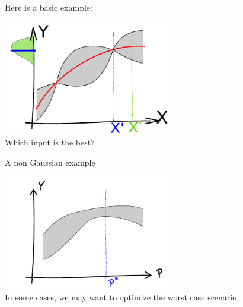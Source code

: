 \begin{frame}{}

\begin{example}
Here is a basic example:
\begin{center}
\includegraphics[height=5cm]{4_optimization/figures/optim_rob_b}\\
Which input is the best?
\end{center}
\end{example}
\end{frame}

\begin{frame}[noframenumbering]{}
\begin{example}
A non Gaussian example
\begin{center}
\includegraphics[height=5cm]{4_optimization/figures/optim_rob_c}\\
In some cases, we may want to optimize the worst case scenario.
\end{center}
\end{example}
\end{frame}

